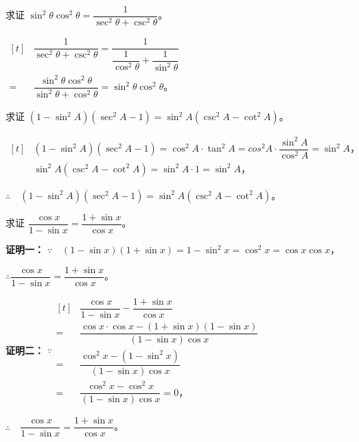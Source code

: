 \liti 求证 $\sin^2 \theta \cos^2 \theta = \dfrac{1}{\sec^2 \theta + \csc^2 \theta}$。

\vspace{0.5em}
\zhengming $\begin{aligned}[t]
    & \dfrac{1}{\sec^2 \theta + \csc^2 \theta} = \dfrac{1}{\dfrac{1}{\cos^2 \theta} + \dfrac{1}{\sin^2 \theta}} \\
  = & \dfrac{\sin^2 \theta \cos^2 \theta}{\sin^2 \theta + \cos^2 \theta} = \sin^2 \theta \cos^2 \theta \text{。}
\end{aligned}$
\vspace{0.5em}

\liti 求证 $(1 - \sin^2 A)(\sec^2 A - 1) = \sin^2 A(\csc^2 A  - \cot^2 A)$。

\zhengming $\begin{aligned}[t]
    &(1 - \sin^2 A)(\sec^2 A - 1) = \cos^2 A \cdot \tan^2 A = cos^2 A \cdot \dfrac{\sin^2 A}{\cos^2 A} = \sin^2 A \text{，} \\
    &\sin^2 A (\csc^2 A - \cot^2 A) = \sin^2 A \cdot 1 = \sin^2 A \text{，}
\end{aligned}$

$\therefore \quad (1 - \sin^2 A)(\sec^2 A - 1) = \sin^2 A (\csc^2 A - \cot^2 A)$。

\vspace{0.5em}
\liti 求证 $\dfrac{\cos x}{1 - \sin x} = \dfrac{1 + \sin x}{\cos x}$。
\vspace{0.5em}

\textbf{证明一：} $\because \quad (1 - \sin x)(1 + \sin x) = 1 - \sin^2 x = \cos^2 x = \cos x \cos x$，

\vspace{0.5em}
$\therefore \dfrac{\cos x}{1 - \sin x} = \dfrac{1 + \sin x}{\cos x}$。
\vspace{0.5em}

\textbf{证明二：} $\because \begin{aligned}[t]
      &\dfrac{\cos x}{1 - \sin x} - \dfrac{1 + \sin x}{\cos x} \\
    = &\dfrac{\cos x \cdot \cos x - (1 + \sin x)(1 - \sin x)}{(1 - \sin x)\cos x} \\
    = &\dfrac{\cos^2 x - (1 - \sin^2 x)}{(1 - \sin x) \cos x} \\
    = &\dfrac{\cos^2 x - \cos^2 x}{(1 - \sin x) \cos x} = 0 \text{，}
\end{aligned}$

\vspace{0.5em}
$\therefore \quad \dfrac{\cos x}{1 - \sin x} = \dfrac{1 + \sin x}{\cos x}$。
\vspace{0.5em}


